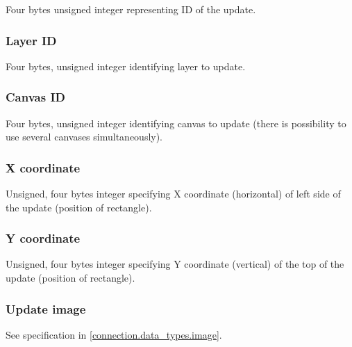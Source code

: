 Four bytes unsigned integer representing ID of the update.

\subsubsection{Layer ID}

Four bytes, unsigned integer identifying layer to update.

\subsubsection{Canvas ID}

Four bytes, unsigned integer identifying canvas to update (there is possibility to use several canvases simultaneously).

\subsubsection{X coordinate}

Unsigned, four bytes integer specifying X coordinate (horizontal) of left side of the update (position of rectangle).

\subsubsection{Y coordinate}

Unsigned, four bytes integer specifying Y coordinate (vertical) of the top of the update (position of rectangle).

\subsubsection{Update image}

See specification in \ref{connection.data_types.image}.